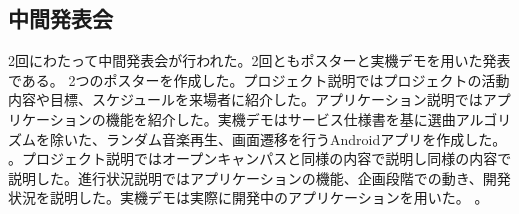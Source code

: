 \subsection{中間発表会}
2回にわたって中間発表会が行われた。2回ともポスターと実機デモを用いた発表である。
2つのポスターを作成した。プロジェクト説明ではプロジェクトの活動内容や目標、スケジュールを来場者に紹介した。アプリケーション説明ではアプリケーションの機能を紹介した。実機デモはサービス仕様書を基に選曲アルゴリズムを除いた、ランダム音楽再生、画面遷移を行うAndroidアプリを作成した。
。プロジェクト説明ではオープンキャンパスと同様の内容で説明し同様の内容で説明した。進行状況説明ではアプリケーションの機能、企画段階での動き、開発状況を説明した。実機デモは実際に開発中のアプリケーションを用いた。
。
